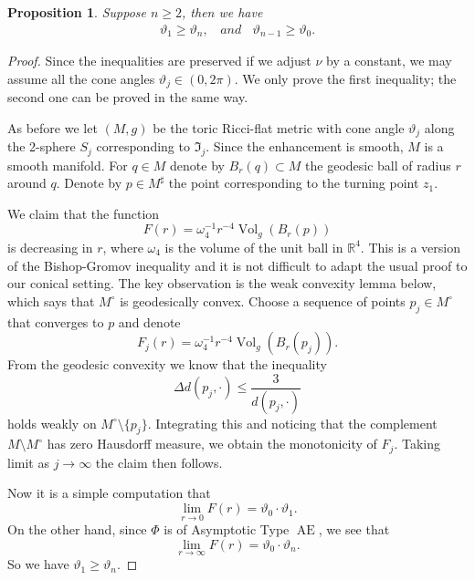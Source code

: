 \documentclass[a4paper,11pt]{amsart}
\newtheorem{proposition}[theorem]{Proposition}
\theoremstyle{definition}
\numberwithin{equation}{section}
\newcommand{\R}{\mathbb{R}}
\newcommand{\mI} {\mathfrak I}
\DeclareMathOperator{\Vol}{Vol}
\DeclareMathOperator{\Ae}{AE}
\begin{document}
\begin{proposition} \label{p:angle comparison}
   Suppose $n\geq 2$, then we have
    \begin{align}\label{e:angle comparison}
        \vartheta_1\geq\vartheta_{n}, \ \ \ \  and\ \ \ \ 
        \vartheta_{n-1}\geq\vartheta_0.
    \end{align}
\end{proposition}
\begin{proof}
Since the inequalities are preserved if we adjust $\nu$ by a constant, we may assume all the cone angles $\vartheta_j\in (0, 2\pi)$. We only prove the first inequality; the second one can be proved in the same way. 

As before we let $(M, g)$ be the toric Ricci-flat metric with cone angle $\vartheta_j$ along the 2-sphere $S_j$ corresponding to $\mI_j$. Since the enhancement is smooth, $M$ is a smooth manifold. For $q\in M$ denote by $B_r(q)\subset M$ the geodesic ball of radius $r$ around $q$.   Denote by $p\in M^\sharp$ the point corresponding to the turning point $z_1$. 

We claim that the function $$F(r)=\omega_4^{-1}r^{-4}\Vol_g(B_r(p))$$ is decreasing in $r$, where $\omega_4$ is the volume of the unit ball in $\R^4$. This is a version of the Bishop-Gromov inequality and it is not difficult to adapt the usual proof to our conical setting. The key observation is the weak convexity lemma below, which says that $M^\circ$ is geodesically convex. Choose a sequence of points $p_j\in M^\circ$ that converges to $p$ and denote 
$$F_j(r)=\omega_4^{-1}r^{-4}\Vol_g(B_r(p_j)).$$
From the geodesic convexity we know that the inequality $$\Delta d(p_j, \cdot)\leq \frac{3}{d(p_j, \cdot)}$$ holds weakly on $M^\circ\setminus \{p_j\}$. Integrating this and noticing that the complement $M\setminus M^\circ$ has zero Hausdorff measure, we obtain the monotonicity of $F_j$. Taking limit as $j\rightarrow\infty$ the claim then follows. 

Now it is a simple computation that 
$$\lim_{r\rightarrow0}F(r)=\vartheta_0\cdot\vartheta_1.$$
On the other hand, since $\Phi$ is of  Asymptotic Type  $\Ae$, we see that
$$\lim_{r\rightarrow\infty}F(r)=\vartheta_0\cdot\vartheta_n.$$
So we have $\vartheta_1\geq\vartheta_n$. 
 
\end{proof}
\end{document}
